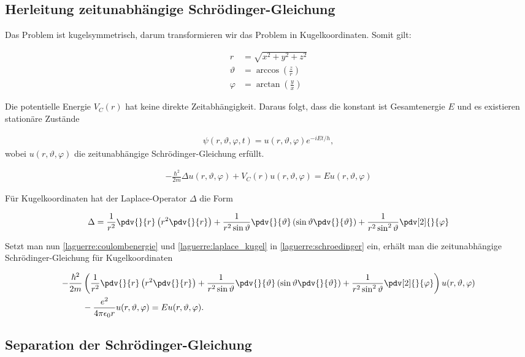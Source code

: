 \subsection{Herleitung zeitunabhängige Schrödinger-Gleichung}
\label{laguerre:subsection:herleitung_schroedinger}
Das Problem ist kugelsymmetrisch, 
darum transformieren wir das Problem in Kugelkoordinaten.
Somit gilt:

\begin{align*}
    r
    & =
    \sqrt{x^2 + y^2 + z^2}\\
    \vartheta
    & =
    \arccos\left(\frac{z}{r}\right)\\
    \varphi
    & =
    \arctan\left(\frac{y}{x}\right)
\end{align*}

Die potentielle Energie $V_C(r)$ hat keine direkte Zeitabhängigkeit.
Daraus folgt, dass die konstant ist Gesamtenergie $E$
und es existieren stationäre Zustände

\begin{align}
    \psi(r, \vartheta, \varphi, t)
    =
    u(r, \vartheta, \varphi) e^{-i E t / h},
\end{align}
wobei $u(r, \vartheta, \varphi)$ 
die zeitunabhängige Schrödinger-Gleichung erfüllt.

\begin{align}
    -\frac{\hbar^2}{2m} \Delta u(r, \vartheta, \varphi)
    + V_C(r) u(r, \vartheta, \varphi)
    =
    E u(r, \vartheta, \varphi)
    \label{laguerre:schroedinger}
\end{align}

Für Kugelkoordinaten hat der Laplace-Operator $\Delta$ die Form

\begin{align}
    \Delta
    =
    \frac{1}{r^2} \pdv{}{r} \left( r^2 \pdv{}{r} \right)
    + \frac{1}{r^2 \sin\vartheta} \pdv{}{\vartheta} 
    \left(\sin\vartheta \pdv{}{\vartheta}\right)
    + \frac{1}{r^2 \sin^2\vartheta} \pdv[2]{}{\varphi}
    \label{laguerre:laplace_kugel}
\end{align}

Setzt man nun 
\eqref{laguerre:coulombenergie} und \eqref{laguerre:laplace_kugel} 
in \eqref{laguerre:schroedinger} ein,
erhält man die zeitunabhängige Schrödinger-Gleichung für Kugelkoordinaten

\begin{align}
\nonumber
- \frac{\hbar^2}{2m} 
&
\left( 
\frac{1}{r^2} \pdv{}{r}
\left( r^2 \pdv{}{r} \right)
+
\frac{1}{r^2 \sin \vartheta} \pdv{}{\vartheta}
\left( \sin \vartheta \pdv{}{\vartheta} \right)
+
\frac{1}{r^2 \sin^2 \vartheta} \pdv[2]{}{\varphi}
\right)
u(r, \vartheta, \varphi)
\\
& -
\frac{e^2}{4 \pi \epsilon_0 r} u(r, \vartheta, \varphi)
=
E u(r, \vartheta, \varphi).
\label{laguerre:pdg_h_atom}
\end{align}

\subsection{Separation der Schrödinger-Gleichung}
\label{laguerre:subsection:seperation_schroedinger}
